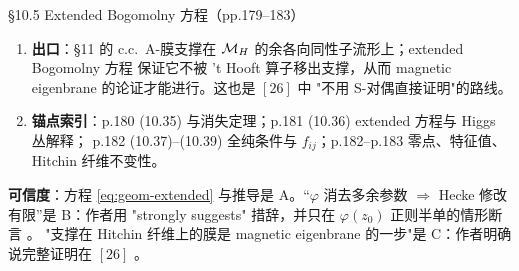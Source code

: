 \begin{kcard}{\S10.5 Extended Bogomolny 方程（pp.179--183）}
\begin{enumerate}[label=\textbf{\arabic*}]
\begin{equation}
\end{equation}
  即 $\varphi$ 在 $Y(\Lw,z_0)$ 上定义向量场，零点 $=$ 可能的 Hecke 修改；$\varphi(z_0)$
  正则半单时这些零点就是特征方向 \pA{}。
\item \textbf{出口}：\S11 的 c.c.\ A-膜支撑在 $\mathcal{M}_H$ 的余各向同性子流形上；extended Bogomolny 方程
  保证它不被 't Hooft 算子移出支撑，从而 magnetic eigenbrane 的论证才能进行。这也是 $[26]$ 中
  "不用 S-对偶直接证明"的路线。
\item \textbf{锚点索引}：p.180 (10.35) 与消失定理；p.181 (10.36) extended 方程与 Higgs 丛解释；
  p.182 (10.37)--(10.39) 全纯条件与 $f_{ij}$；p.182--p.183 零点、特征值、Hitchin 纤维不变性。
\end{enumerate}
\textbf{可信度}：方程 \eqref{eq:geom-extended} 与推导是 A。“$\varphi$ 消去多余参数 $\Rightarrow$ Hecke 修改
有限”是 B：作者用 "strongly suggests" 措辞，并只在 $\varphi(z_0)$ 正则半单的情形断言 \pB{}。
"支撑在 Hitchin 纤维上的膜是 magnetic eigenbrane 的一步"是 C：作者明确说完整证明在 $[26]$
\pC{}。
\end{kcard}

